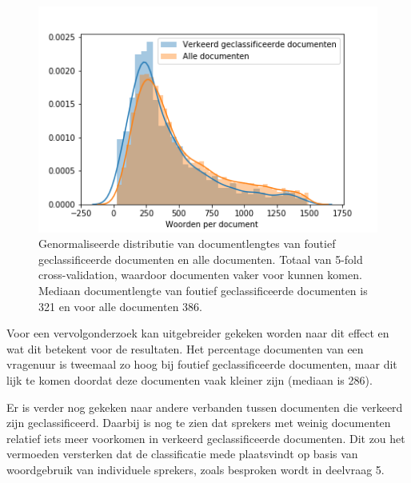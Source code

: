 \begin{figure}[H]
  \centering
    \includegraphics[width=0.40\paperwidth]{Verslag/Tables/misclassifiedlengths.png}
\caption{Genormaliseerde distributie van documentlengtes van foutief geclassificeerde documenten en alle documenten. Totaal van 5-fold cross-validation, waardoor documenten vaker voor kunnen komen. Mediaan documentlengte van foutief geclassificeerde documenten is 321 en voor alle documenten 386.}
\label{fig:misclassified}
\end{figure}
Voor een vervolgonderzoek kan uitgebreider gekeken worden naar dit effect en wat dit betekent voor de resultaten. Het percentage documenten van een vragenuur is tweemaal zo hoog bij foutief geclassificeerde documenten, maar dit lijk te komen doordat deze documenten vaak kleiner zijn (mediaan is 286).\par
Er is verder nog gekeken naar andere verbanden tussen documenten die verkeerd zijn geclassificeerd. Daarbij is nog te zien dat sprekers met weinig documenten relatief iets meer voorkomen in verkeerd geclassificeerde documenten.
Dit zou het vermoeden versterken dat de classificatie mede plaatsvindt op basis van woordgebruik van individuele sprekers, zoals besproken wordt in deelvraag 5.\par


